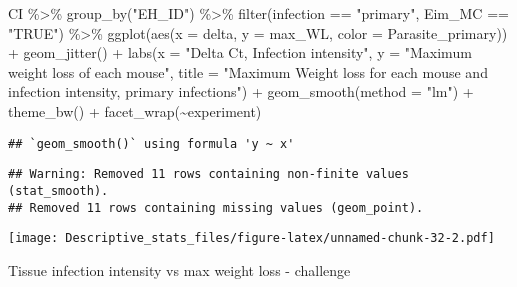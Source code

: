 \documentclass[
]{article}
\newenvironment{Shaded}{\begin{snugshade}}{\end{snugshade}}
\newcommand{\AttributeTok}[1]{\textcolor[rgb]{0.77,0.63,0.00}{#1}}
\newcommand{\FunctionTok}[1]{\textcolor[rgb]{0.00,0.00,0.00}{#1}}
\newcommand{\NormalTok}[1]{#1}
\newcommand{\SpecialCharTok}[1]{\textcolor[rgb]{0.00,0.00,0.00}{#1}}
\newcommand{\StringTok}[1]{\textcolor[rgb]{0.31,0.60,0.02}{#1}}
\begin{document}
\begin{Shaded}
\begin{Highlighting}[]
\NormalTok{CI  }\SpecialCharTok{\%\textgreater{}\%}
  \FunctionTok{group\_by}\NormalTok{(}\StringTok{"EH\_ID"}\NormalTok{) }\SpecialCharTok{\%\textgreater{}\%}
  \FunctionTok{filter}\NormalTok{(infection }\SpecialCharTok{==} \StringTok{"primary"}\NormalTok{, Eim\_MC }\SpecialCharTok{==} \StringTok{"TRUE"}\NormalTok{) }\SpecialCharTok{\%\textgreater{}\%}
  \FunctionTok{ggplot}\NormalTok{(}\FunctionTok{aes}\NormalTok{(}\AttributeTok{x =}\NormalTok{ delta, }\AttributeTok{y =}\NormalTok{ max\_WL, }\AttributeTok{color =}\NormalTok{ Parasite\_primary)) }\SpecialCharTok{+}
  \FunctionTok{geom\_jitter}\NormalTok{() }\SpecialCharTok{+}
  \FunctionTok{labs}\NormalTok{(}\AttributeTok{x =} \StringTok{"Delta Ct, Infection intensity"}\NormalTok{, }\AttributeTok{y =} \StringTok{"Maximum weight loss of each mouse"}\NormalTok{,}
       \AttributeTok{title =} \StringTok{"Maximum Weight loss for each mouse and infection intensity, }
\StringTok{       primary infections"}\NormalTok{) }\SpecialCharTok{+}
    \FunctionTok{geom\_smooth}\NormalTok{(}\AttributeTok{method =} \StringTok{"lm"}\NormalTok{) }\SpecialCharTok{+}
    \FunctionTok{theme\_bw}\NormalTok{() }\SpecialCharTok{+}
    \FunctionTok{facet\_wrap}\NormalTok{(}\SpecialCharTok{\textasciitilde{}}\NormalTok{experiment)}
\end{Highlighting}
\end{Shaded}

\begin{verbatim}
## `geom_smooth()` using formula 'y ~ x'
\end{verbatim}

\begin{verbatim}
## Warning: Removed 11 rows containing non-finite values (stat_smooth).
## Removed 11 rows containing missing values (geom_point).
\end{verbatim}

\texttt{[image: Descriptive\_stats\_files/figure-latex/unnamed-chunk-32-2.pdf]}

Tissue infection intensity vs max weight loss - challenge
\end{document}
